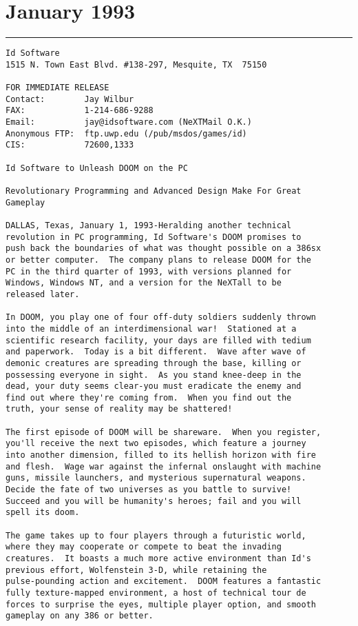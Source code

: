 \section{January 1993}
\label{label_pressrelease}
\hrule \par \bigskip
\begin{verbatim}
Id Software
1515 N. Town East Blvd. #138-297, Mesquite, TX  75150

FOR IMMEDIATE RELEASE
Contact:        Jay Wilbur
FAX:            1-214-686-9288
Email:          jay@idsoftware.com (NeXTMail O.K.)
Anonymous FTP:  ftp.uwp.edu (/pub/msdos/games/id)
CIS:            72600,1333

Id Software to Unleash DOOM on the PC

Revolutionary Programming and Advanced Design Make For Great
Gameplay

DALLAS, Texas, January 1, 1993-Heralding another technical
revolution in PC programming, Id Software's DOOM promises to
push back the boundaries of what was thought possible on a 386sx
or better computer.  The company plans to release DOOM for the
PC in the third quarter of 1993, with versions planned for 
Windows, Windows NT, and a version for the NeXTall to be
released later.

In DOOM, you play one of four off-duty soldiers suddenly thrown
into the middle of an interdimensional war!  Stationed at a
scientific research facility, your days are filled with tedium
and paperwork.  Today is a bit different.  Wave after wave of
demonic creatures are spreading through the base, killing or
possessing everyone in sight.  As you stand knee-deep in the
dead, your duty seems clear-you must eradicate the enemy and
find out where they're coming from.  When you find out the
truth, your sense of reality may be shattered!

The first episode of DOOM will be shareware.  When you register,
you'll receive the next two episodes, which feature a journey
into another dimension, filled to its hellish horizon with fire
and flesh.  Wage war against the infernal onslaught with machine
guns, missile launchers, and mysterious supernatural weapons. 
Decide the fate of two universes as you battle to survive! 
Succeed and you will be humanity's heroes; fail and you will
spell its doom.

The game takes up to four players through a futuristic world,
where they may cooperate or compete to beat the invading
creatures.  It boasts a much more active environment than Id's
previous effort, Wolfenstein 3-D, while retaining the
pulse-pounding action and excitement.  DOOM features a fantastic
fully texture-mapped environment, a host of technical tour de
forces to surprise the eyes, multiple player option, and smooth
gameplay on any 386 or better.


\end{verbatim}
